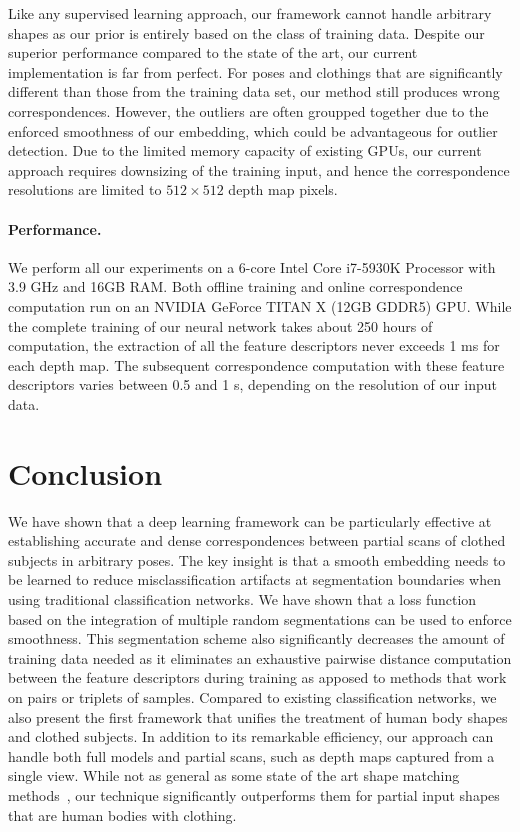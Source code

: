 \documentclass[10pt,twocolumn,letterpaper]{article}
\begin{document}
Like any supervised learning approach, our framework cannot handle arbitrary shapes as our prior is entirely based on the class of training data.
Despite our superior performance compared to the state of the art, our current implementation is far from perfect. For poses and clothings that are significantly different than those from the training data set, our method still produces wrong correspondences. However, the outliers are often groupped together due to the enforced smoothness of our embedding, which could be advantageous for outlier detection. 
Due to the limited memory capacity of existing GPUs, our current approach requires downsizing of the training input, and hence the correspondence resolutions are limited to $512\times512$ depth map pixels.

\paragraph{Performance.}
We perform all our experiments on a 6-core Intel Core i7-5930K Processor with 3.9 GHz and 16GB RAM. Both offline training and online correspondence computation run on an NVIDIA GeForce TITAN X (12GB GDDR5) GPU. While the complete training of our neural network takes about 250 hours of computation, the extraction of all the feature descriptors never exceeds 1 ms for each depth map. The subsequent correspondence computation with these feature descriptors varies between 0.5 and 1 s, depending on the resolution of our input data. 

\section{Conclusion}

We have shown that a deep learning framework can be particularly effective at establishing accurate and dense correspondences between partial scans of clothed subjects in arbitrary poses. The key insight is that a smooth embedding needs to be learned to reduce misclassification artifacts at segmentation boundaries when using traditional classification networks. We have shown that a loss function based on the integration of multiple random segmentations can be used to enforce smoothness. This segmentation scheme also significantly decreases the amount of training data needed as it eliminates an exhaustive pairwise distance computation between the feature descriptors during training as apposed to methods that work on pairs or triplets of samples. Compared to existing classification networks, we also present the first framework that unifies the treatment of human body shapes and clothed subjects. In addition to its remarkable efficiency, our approach can handle both full models and partial scans, such as depth maps captured from a single view. While not as general as some state of the art shape matching methods~\cite{Kim11,Lipman:2009:MVS,Rodola_2014_CVPR,chen15}, our technique significantly outperforms them for partial input shapes that are human bodies with clothing.
\end{document}
